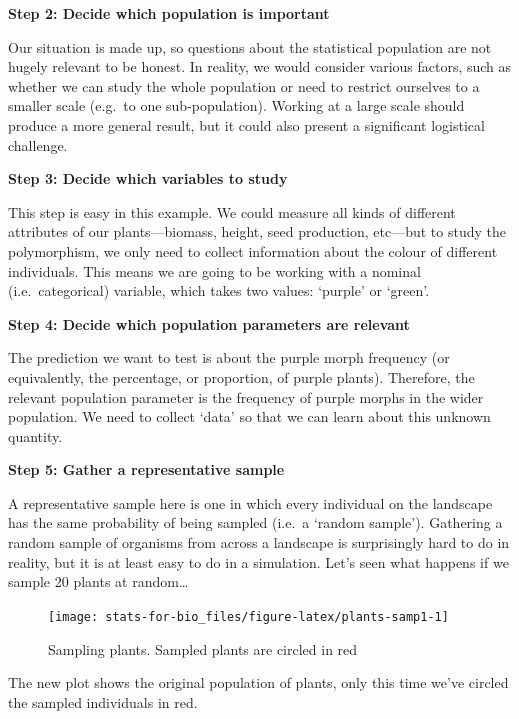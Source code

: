\documentclass[]{book}
\begin{document}
\textbf{Step 2: Decide which population is important}

Our situation is made up, so questions about the statistical population
are not hugely relevant to be honest. In reality, we would consider
various factors, such as whether we can study the whole population or
need to restrict ourselves to a smaller scale (e.g.~to one
sub-population). Working at a large scale should produce a more general
result, but it could also present a significant logistical challenge.

\textbf{Step 3: Decide which variables to study}

This step is easy in this example. We could measure all kinds of
different attributes of our plants---biomass, height, seed production,
etc---but to study the polymorphism, we only need to collect information
about the colour of different individuals. This means we are going to be
working with a nominal (i.e.~categorical) variable, which takes two
values: `purple' or `green'.

\textbf{Step 4: Decide which population parameters are relevant}

The prediction we want to test is about the purple morph frequency (or
equivalently, the percentage, or proportion, of purple plants).
Therefore, the relevant population parameter is the frequency of purple
morphs in the wider population. We need to collect `data' so that we can
learn about this unknown quantity.

\textbf{Step 5: Gather a representative sample}

A representative sample here is one in which every individual on the
landscape has the same probability of being sampled (i.e.~a `random
sample'). Gathering a random sample of organisms from across a landscape
is surprisingly hard to do in reality, but it is at least easy to do in
a simulation. Let's seen what happens if we sample 20 plants at
random\ldots{}

\begin{figure}

{\centering \texttt{[image: stats-for-bio\_files/figure-latex/plants-samp1-1]} 

}

\caption{Sampling plants. Sampled plants are circled in red}\label{fig:plants-samp1}
\end{figure}

The new plot shows the original population of plants, only this time
we've circled the sampled individuals in red.
\end{document}
